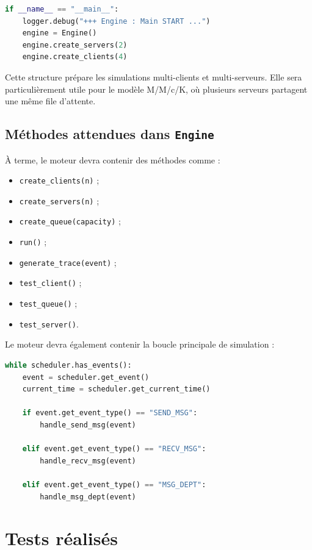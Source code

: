 \documentclass{article}
\begin{document}
\begin{lstlisting}[language=Python, caption=Bloc principal de Engine.py]
if __name__ == "__main__":
    logger.debug("+++ Engine : Main START ...")
    engine = Engine()
    engine.create_servers(2)
    engine.create_clients(4)
\end{lstlisting}

Cette structure prépare les simulations multi-clients et multi-serveurs. Elle sera particulièrement utile pour le modèle M/M/c/K, où plusieurs serveurs partagent une même file d’attente.

\subsection{Méthodes attendues dans \texttt{Engine}}

À terme, le moteur devra contenir des méthodes comme :
\begin{itemize}[leftmargin=*]
    \item \texttt{create\_clients(n)} ;
    \item \texttt{create\_servers(n)} ;
    \item \texttt{create\_queue(capacity)} ;
    \item \texttt{run()} ;
    \item \texttt{generate\_trace(event)} ;
    \item \texttt{test\_client()} ;
    \item \texttt{test\_queue()} ;
    \item \texttt{test\_server()}.
\end{itemize}

Le moteur devra également contenir la boucle principale de simulation :

\begin{lstlisting}[language=Python, caption=Boucle principale conceptuelle]
while scheduler.has_events():
    event = scheduler.get_event()
    current_time = scheduler.get_current_time()

    if event.get_event_type() == "SEND_MSG":
        handle_send_msg(event)

    elif event.get_event_type() == "RECV_MSG":
        handle_recv_msg(event)

    elif event.get_event_type() == "MSG_DEPT":
        handle_msg_dept(event)
\end{lstlisting}

\section{Tests réalisés}
\end{document}
